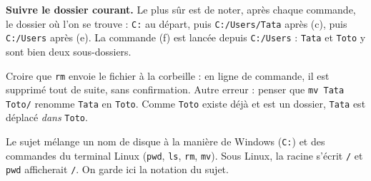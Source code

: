 \documentclass[11pt, a4paper]{exam}
\newcommand{\code}[1]{\texttt{#1}}
\begin{document}
\textbf{Suivre le dossier courant.} Le plus sûr est de noter, après chaque commande, le dossier où l'on se trouve : \code{C:} au départ, puis \code{C:/Users/Tata} après (c), puis \code{C:/Users} après (e). La commande (f) est lancée depuis \code{C:/Users} : \code{Tata} et \code{Toto} y sont bien deux sous-dossiers.
\begin{erreur}
Croire que \code{rm} envoie le fichier à la corbeille : en ligne de commande, il est supprimé tout de suite, sans confirmation. Autre erreur : penser que \code{mv Tata Toto/} renomme \code{Tata} en \code{Toto}. Comme \code{Toto} existe déjà et est un dossier, \code{Tata} est déplacé \emph{dans} \code{Toto}.
\end{erreur}
\begin{remarque}
Le sujet mélange un nom de disque à la manière de Windows (\code{C:}) et des commandes du terminal Linux (\code{pwd}, \code{ls}, \code{rm}, \code{mv}). Sous Linux, la racine s'écrit \code{/} et \code{pwd} afficherait \code{/}. On garde ici la notation du sujet.
\end{remarque}
\end{document}
